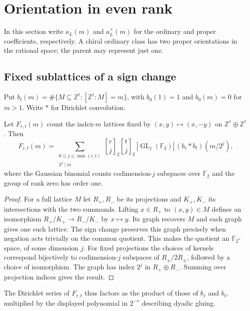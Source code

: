 \section{Orientation in even rank}\label{sec:quaternary}
In this section write $a_L(m)$ and $a_L^+(m)$ for the ordinary
and proper coefficients, respectively. A chiral ordinary class has
two proper orientations in the rational space; the parent may
represent just one.

\subsection{Fixed sublattices of a sign change}
Put $b_t(m)=\#\{M\subseteq\mathbb Z^t:[\mathbb Z^t:M]=m\}$, with $b_0(1)=1$ and $b_0(m)=0$ for $m>1$. Write $*$ for Dirichlet convolution.

\begin{lemma}\label{lem:split-sign-glue}
Let $F_{r,t}(m)$ count the index-$m$ lattices fixed by $(x,y)\mapsto(x,-y)$ on $\mathbb Z^r\oplus\mathbb Z^t$. Then
\[
 F_{r,t}(m)=
 \sum_{\substack{0\le j\le \min(r,t)\\2^j\mid m}}
 \genfrac{[}{]}{0pt}{}{r}{j}_{2}\genfrac{[}{]}{0pt}{}{t}{j}_{2}\,
 |\operatorname{GL}_j(\mathbb F_2)|\,(b_r*b_t)(m/2^j),
\]
where the Gaussian binomial counts codimension-$j$ subspaces over $\mathbb F_2$ and the group of rank zero has order one.
\end{lemma}
\begin{proof}
For a full lattice $M$ let $R_+,R_-$ be its projections and $K_+,K_-$ its intersections with the two summands. Lifting $x\in R_+$ to $(x,y)\in M$ defines an isomorphism $R_+/K_+\longrightarrow R_-/K_-$ by $x\mapsto y$. Its graph recovers $M$ and each graph gives one such lattice. The sign change preserves this graph precisely when negation acts trivially on the common quotient. This makes the quotient an $\mathbb F_2$-space, of some dimension $j$. For fixed projections the choices of kernels correspond bijectively to codimension-$j$ subspaces of $R_\pm/2R_\pm$, followed by a choice of isomorphism. The graph has index $2^j$ in $R_+\oplus R_-$. Summing over projection indices gives the result.
\end{proof}
The Dirichlet series of $F_{r,t}$ thus factors as the product
of those of $b_r$ and $b_t$, multiplied by the displayed polynomial
in $2^{-s}$ describing dyadic gluing.

